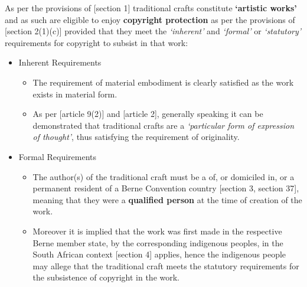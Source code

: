 \documentclass[11pt]{article}
\begin{document}
As per the provisions of [section 1]\cite{rsa78_copyrightact} traditional crafts
constitute \textbf{`artistic works'} and as such are eligible to enjoy \textbf{copyright
protection} as per the provisions of [section 2(1)(c)]\cite{rsa78_copyrightact}
provided that they meet the \emph{`inherent'} and \emph{`formal'} or \emph{`statutory'}
requirements for copyright to subsist in that work:
\begin{itemize}
\item Inherent Requirements
\begin{itemize}
\item The requirement of material embodiment is clearly satisfied as the
work exists in material form.
\item As per [article 9(2)]\cite{wto17_trips} and [article
2]\cite{wipo96_copyright_treaty}, generally speaking it can be demonstrated
that traditional crafts are a \emph{`particular form of expression of thought'},
thus satisfying the requirement of originality.
\end{itemize}
\item Formal Requirements
\begin{itemize}
\item The author(s) of the traditional craft must be a of, or domiciled in, or a
permanent resident of a Berne Convention country [section 3, section
37]\cite{wipo86_berne}, meaning that they were a \textbf{qualified person} at the time
of creation of the work.
\item Moreover it is implied that the work was first made in the respective Berne
member state, by the corresponding indigenous peoples, in the South African
context [section 4]\cite{rsa78_copyrightact} applies, hence the indigenous
people may allege that the traditional craft meets the statutory
requirements for the subsistence of copyright in the work.
\end{itemize}
\end{itemize}
\end{document}

